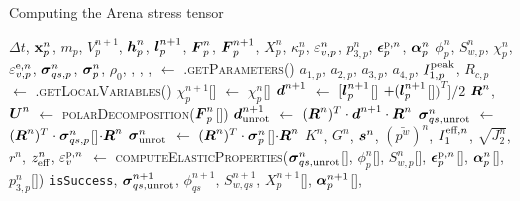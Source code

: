 \begin{breakablealgorithm}
  \caption{Computing the Arena stress tensor}
  \begin{algorithmic}[1]
    \Require $\Delta t$, $\mathbf{x}_p^n$, $m_p$, $V_p^{n+1}$, $\boldsymbol{h}_p^n$, $\boldsymbol{l}_p^{n+1}$, $\boldsymbol{F}_p^n$, $\boldsymbol{F}_p^{n+1}$,
             $X^n_p$, $\kappa^n_p$, $\varepsilon^n_{v,p}$, $p^n_{3,p}$, $\boldsymbol{\epsilon}^{\text{p},n}_p$, $\boldsymbol{\alpha}^n_p$  
             $\phi_p^n$, $S_{w,p}^n$, $\chi_p^n$, $\varepsilon_{v,p}^{\text{e},n}$, $\boldsymbol{\sigma}_{qs,p}^n$, 
             $\boldsymbol{\sigma}_p^n$, $\rho_0$, , ,
             , 
      \State {} $\leftarrow$ .\textsc{getParameters}()
      \State $a_{1,p}$, $a_{2,p}$, $a_{3,p}$, $a_{4,p}$, $I_{1,p}^{\text{peak}}$, $R_{c,p}$ $\leftarrow$ 
        .\textsc{getLocalVariables}() \WRP
        \State $\chi_p^{n+1}$[\TTpart] $\leftarrow$ $\chi_p^n$[\TTpart]
        \State $\boldsymbol{d}^{n+1}$ $\leftarrow$ $[\boldsymbol{l}_p^{n+1}$[\TTpart] $+ (\boldsymbol{l}_p^{n+1}$[\TTpart]$)^T]/2$
        \State $\boldsymbol{R}^n$, $\boldsymbol{U}^n$ $\leftarrow$ \textsc{polarDecomposition}($\boldsymbol{F}_p^n$[\TTpart])
        \State $\boldsymbol{d}^{n+1}_{\text{unrot}}$ $\leftarrow$ $(\boldsymbol{R}^n)^T \cdot \boldsymbol{d}^{n+1} \cdot \boldsymbol{R}^n$
        \State $\boldsymbol{\sigma}^n_{qs,\text{unrot}}$ $\leftarrow$ $(\boldsymbol{R}^n)^T \cdot \boldsymbol{\sigma}^n_{qs,p}$[\TTpart]$ \cdot \boldsymbol{R}^n$
        \State $\boldsymbol{\sigma}^n_{\text{unrot}}$ $\leftarrow$ $(\boldsymbol{R}^n)^T \cdot \boldsymbol{\sigma}^n_p$[\TTpart]$ \cdot \boldsymbol{R}^n$
        \State $K^n$, $G^n$, $\boldsymbol{s}^n$, $(\bar{p^w})^n$, $I_1^{\text{eff},n}$, 
             $\sqrt{J_2^n}$, $r^n$, $z_{\text{eff}}^n$, $\varepsilon_v^{\text{p},n}$ $\leftarrow$ \WRP
          \textsc{computeElasticProperties}($\boldsymbol{\sigma}^n_{qs,\text{unrot}}$[\TTpart], \WRP
             $\phi_p^n$[\TTpart], $S_{w,p}^n$[\TTpart], $\boldsymbol{\epsilon}^{\text{p},n}_p$[\TTpart], $\boldsymbol{\alpha}^n_p$[\TTpart],
             $p^n_{3,p}$[\TTpart]) \WRP
        \State \texttt{isSuccess}, $\boldsymbol{\sigma}_{qs,\text{unrot}}^{n+1}$, $\phi_{qs}^{n+1}$, $S_{w,qs}^{n+1}$, 
           $X_{p}^{n+1}$[\TTpart], $\boldsymbol{\alpha}_{p}^{n+1}$[\TTpart],

\end{algorithmic}
\end{breakablealgorithm}
